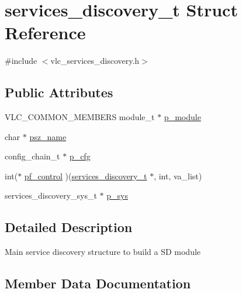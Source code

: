 \hypertarget{structservices__discovery__t}{}\section{services\+\_\+discovery\+\_\+t Struct Reference}
\label{structservices__discovery__t}


{\ttfamily \#include $<$vlc\+\_\+services\+\_\+discovery.\+h$>$}

\subsection*{Public Attributes}
\begin{DoxyCompactItemize}
\item 
V\+L\+C\+\_\+\+C\+O\+M\+M\+O\+N\+\_\+\+M\+E\+M\+B\+E\+RS module\+\_\+t $\ast$ \hyperlink{structservices__discovery__t_ad98317159b4b863f2668c45c585fcfc8}{p\+\_\+module}
\item 
char $\ast$ \hyperlink{structservices__discovery__t_a943a6b17e106d5ac925e4f7231254e85}{psz\+\_\+name}
\item 
config\+\_\+chain\+\_\+t $\ast$ \hyperlink{structservices__discovery__t_a129cd01ed2aae5d4e53cd11459f23193}{p\+\_\+cfg}
\item 
int($\ast$ \hyperlink{structservices__discovery__t_ae90cf2de1b188a893f2b4b1cc77bc6ad}{pf\+\_\+control} )(\hyperlink{structservices__discovery__t}{services\+\_\+discovery\+\_\+t} $\ast$, int, va\+\_\+list)
\item 
services\+\_\+discovery\+\_\+sys\+\_\+t $\ast$ \hyperlink{structservices__discovery__t_a354e9387c226bd847a484401726135d8}{p\+\_\+sys}
\end{DoxyCompactItemize}


\subsection{Detailed Description}
Main service discovery structure to build a SD module 

\subsection{Member Data Documentation}
\mbox{\label{structservices__discovery__t_a129cd01ed2aae5d4e53cd11459f23193}} 
